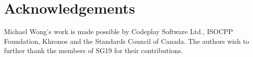 \section{Acknowledgements}
Michael Wong's work is made possible by Codeplay Software Ltd., ISOCPP Foundation, Khronos and the Standards Council of Canada.  The authors wish to further thank the members of SG19 for their contributions.


